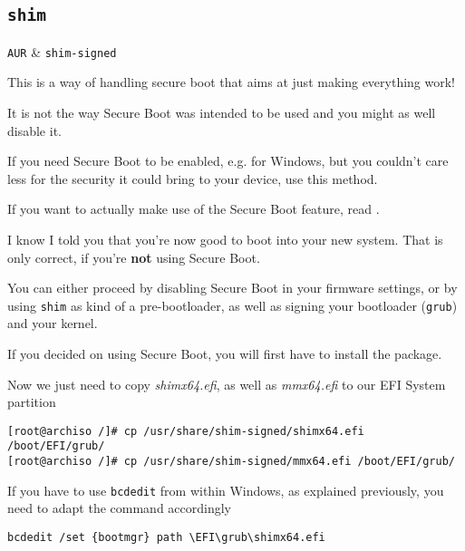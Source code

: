 \documentclass[10pt]{dustdoc}
\begin{document}
\subsection{\texttt{shim}}
\label{sec:shim}

\begin{packagetable}
    \texttt{AUR} & \texttt{shim-signed} \\
\end{packagetable}

\begin{WARNING}
    This is a way of handling secure boot that aims at just making everything work!

    It is not the way Secure Boot was intended to be used and you might as well disable it.

    If you need Secure Boot to be enabled, e.g. for Windows, but you couldn’t care less for the security it could bring to your device, use this method.

    If you want to actually make use of the Secure Boot feature, read .
\end{WARNING}

I know I told you that you’re now good to boot into your new system.
That is only correct, if you’re \textbf{not} using Secure Boot.

You can either proceed by disabling Secure Boot in your firmware settings, or by using \texttt{shim} as kind of a pre-bootloader, as well as signing your bootloader (\texttt{grub}) and your kernel.

If you decided on using Secure Boot, you will first have to install the package.

Now we just need to copy \textit{shimx64.efi}, as well as \textit{mmx64.efi} to our EFI System partition

\begin{verbatim}
[root@archiso /]# cp /usr/share/shim-signed/shimx64.efi /boot/EFI/grub/
[root@archiso /]# cp /usr/share/shim-signed/mmx64.efi /boot/EFI/grub/
\end{verbatim}

\begin{NOTE}
    If you have to use \texttt{bcdedit} from within Windows, as explained previously, you need to adapt the command accordingly

    \begin{verbatim}
bcdedit /set {bootmgr} path \EFI\grub\shimx64.efi
    \end{verbatim}
\end{NOTE}
\end{document}
